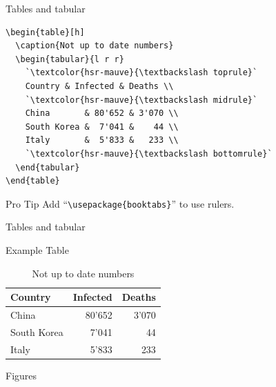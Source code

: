 \documentclass[xetex, onlymath]{beamer}
\begin{document}
\begin{frame}[fragile]{Tables and tabular}
\begin{lstlisting}
\begin{table}[h]
  \caption{Not up to date numbers}
  \begin{tabular}{l r r}
    `\textcolor{hsr-mauve}{\textbackslash toprule}`
    Country & Infected & Deaths \\
    `\textcolor{hsr-mauve}{\textbackslash midrule}`
    China       & 80'652 & 3'070 \\
    South Korea &  7'041 &    44 \\
    Italy       &  5'833 &   233 \\
    `\textcolor{hsr-mauve}{\textbackslash bottomrule}`
  \end{tabular}
\end{table}
\end{lstlisting}
\begin{alertblock}{Pro Tip}
	Add ``\texttt{\textbackslash usepackage\{booktabs\}}'' to use
	rulers.
\end{alertblock}
\end{frame}

\begin{frame}{Tables and tabular}
\begin{exampleblock}{Example Table}
\begin{table}
  \caption{Not up to date numbers}
  \begin{tabular}{l r r}
    \toprule
    Country & Infected & Deaths \\
    \midrule
    China       & 80'652 & 3'070 \\
    South Korea &  7'041 &    44 \\
    Italy       &  5'833 &   233 \\
    \bottomrule
  \end{tabular}
\end{table}
\end{exampleblock}
\end{frame}


\begin{frame}{Figures}
\end{frame}
\end{document}
